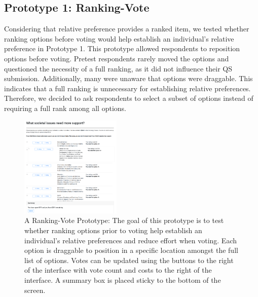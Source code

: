 \subsection{Prototype 1: Ranking-Vote}
Considering that relative preference provides a ranked item, we tested whether ranking options before voting would help establish an individual's relative preference in Prototype 1. This prototype allowed respondents to reposition options before voting. Pretest respondents rarely moved the options and questioned the necessity of a full ranking, as it did not influence their QS submission. Additionally, many were unaware that options were draggable. This indicates that a full ranking is unnecessary for establishing relative preferences. Therefore, we decided to ask respondents to select a subset of options instead of requiring a full rank among all options.

\begin{figure}[ht]
    \centering
    \includegraphics[width=0.43\textwidth]{content/image/prototypes/2_ranking.png}
    \caption{A Ranking-Vote Prototype: The goal of this prototype is to test whether ranking options prior to voting help establish an individual's relative preferences and reduce effort when voting. Each option is draggable to position in a specific location amongst the full list of options. Votes can be updated using the buttons to the right of the interface with vote count and costs to the right of the interface. A summary box is placed sticky to the bottom of the screen.}
    \label{fig:qv_rank}
    \vspace{-7ex}
\end{figure}

